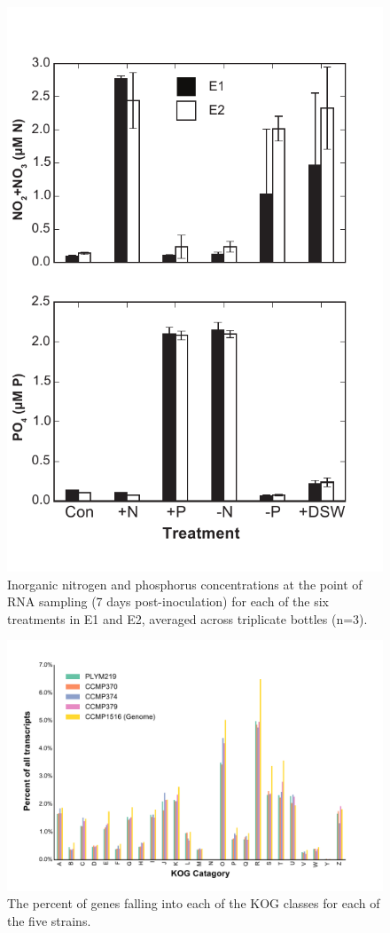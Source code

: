 
\begin{figure}[h!]
  \centering
    \includegraphics[width=.6\textwidth]{Images/C6_FigureS1_nutrients_v1.pdf}
    \caption{Inorganic nitrogen and phosphorus concentrations at the point of RNA sampling (7 days post-inoculation) for each of the six treatments in E1 and E2, averaged across triplicate bottles (n=3).}
    \label{fig:a5f1}
\end{figure}



\begin{figure}[p!]
  \centering
    \includegraphics[width=1.0\textwidth]{Images/C6_FigureS2_KOG_Distribution}
    \caption{The percent of genes falling into each of the KOG classes for each of the five strains.}
    \label{fig:a5f2}
\end{figure}

